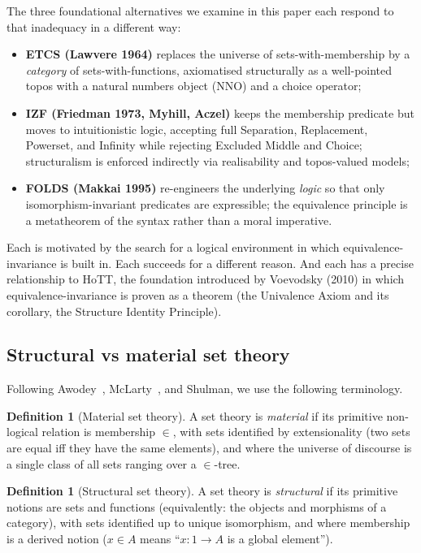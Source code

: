 \documentclass[12pt]{article}
\theoremstyle{definition}
\newtheorem{definition}[theorem]{Definition}
\theoremstyle{remark}
\begin{document}
The three foundational alternatives we examine in this paper each respond to that
inadequacy in a different way:
\begin{itemize}
\item \textbf{ETCS (Lawvere 1964)} replaces the universe of sets-with-membership by a
\emph{category} of sets-with-functions, axiomatised structurally as a well-pointed topos
with a natural numbers object (NNO) and a choice operator;
\item \textbf{IZF (Friedman 1973, Myhill, Aczel)} keeps the membership predicate but
moves to intuitionistic logic, accepting full Separation, Replacement, Powerset, and
Infinity while rejecting Excluded Middle and Choice; structuralism is enforced indirectly
via realisability and topos-valued models;
\item \textbf{FOLDS (Makkai 1995)} re-engineers the underlying \emph{logic} so that only
isomorphism-invariant predicates are expressible; the equivalence principle is a metatheorem
of the syntax rather than a moral imperative.
\end{itemize}

Each is motivated by the search for a logical environment in which equivalence-invariance
is built in. Each succeeds for a different reason. And each has a precise relationship
to HoTT, the foundation introduced by Voevodsky (2010) in which equivalence-invariance is
proven as a theorem (the Univalence Axiom and its corollary, the Structure Identity
Principle).

\subsection{Structural vs material set theory}

Following Awodey~\cite{Awodey2014}, McLarty~\cite{McLarty2004}, and Shulman, we use the
following terminology.

\begin{definition}[Material set theory]
A set theory is \emph{material} if its primitive non-logical relation is membership
$\in$, with sets identified by extensionality (two sets are equal iff they have the same
elements), and where the universe of discourse is a single class of all sets ranging over
a $\in$-tree.
\end{definition}

\begin{definition}[Structural set theory]
A set theory is \emph{structural} if its primitive notions are sets and functions
(equivalently: the objects and morphisms of a category), with sets identified up to
unique isomorphism, and where membership is a derived notion ($x\in A$ means
``$x:1\to A$ is a global element'').
\end{definition}
\end{document}
